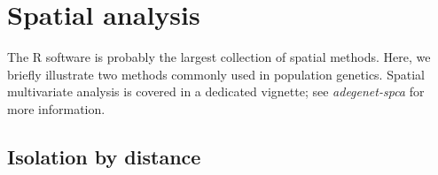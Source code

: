 \documentclass{article}
\begin{document}
\section{Spatial analysis}

The R software is probably the largest collection of spatial methods.
Here, we briefly illustrate two methods commonly used in population genetics.
Spatial multivariate analysis is covered in a dedicated vignette; see \textit{adegenet-spca} for
more information.


\subsection{Isolation by distance}

\end{document}
